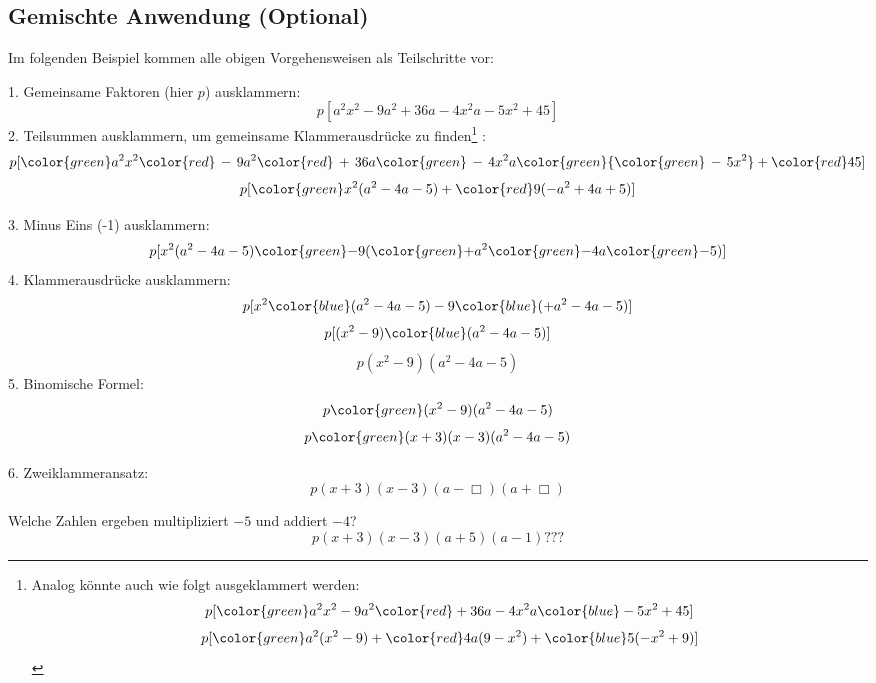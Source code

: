 \newpage


\subsection{Gemischte Anwendung (Optional)}
Im folgenden Beispiel kommen alle obigen Vorgehensweisen als
Teilschritte vor:

\begin{center}{}\end{center}


1. Gemeinsame Faktoren (hier $p$) ausklammern:
$$p[a^2x^2 - 9a^2 + 36a -4x^2a -5x^2 + 45]$$
2. Teilsummen ausklammern, um gemeinsame Klammerausdrücke zu finden\footnote{
Analog könnte auch wie folgt ausgeklammert werden:
$$p[{\color{green}a^2x^2 -9a^2} {\color{red}+ 36a -4x^2a} {\color{blue}- 5x^2 + 45}]$$
$$p[{\color{green}a^2}(x^2 - 9) + {\color{red}4a}(9 - x^2) + {\color{blue}5}(-x^2 + 9)]$$
}
:
$$p[{\color{green}a^2x^2 } {\color{red}\, -\, 9a^2} {\color{red}\, +\, 36a} {\color{green}\, -\, 4x^2a} {\color{green} {\color{green}\,-\,5x^2} } + {\color{red}45}]$$
$$p[{\color{green}x^2} (a^2 -4a -5) + {\color{red}9}(-a^2 + 4a +5)]$$

3. Minus Eins (-1) ausklammern:
$$p[x^2 (a^2 -4a -5) {\color{green}-} 9({\color{green}+}a^2 {\color{green}-} 4a {\color{green}-} 5)]$$
4. Klammerausdrücke ausklammern:
$$p[x^2 {\color{blue}(a^2 -4a -5)} - 9{\color{blue}(+a^2 - 4a - 5)}]$$
$$p[(x^2-9) {\color{blue}(a^2 -4a -5)}]$$
$$p(x^2-9) (a^2 -4a -5)$$
5. Binomische Formel:
$$p{\color{green}(x^2-9)}(a^2 -4a -5)$$
$$p{\color{green}(x+3)(x-3)}(a^2 -4a -5)$$

6. Zweiklammeransatz:
$$p(x+3)(x-3) (a-\Box{})(a+\Box{})$$

Welche Zahlen ergeben multipliziert $-5$ und addiert $-4$?
$$p(x+3)(x-3)(a+5)(a-1) ???$$
\begin{center}{}\end{center}







\newpage
